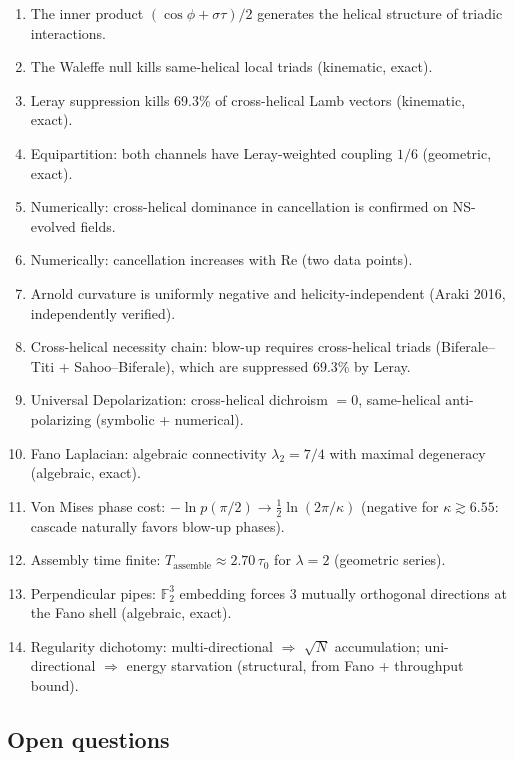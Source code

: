 \documentclass[11pt]{article}
\theoremstyle{definition}
\theoremstyle{remark}
\begin{document}
\begin{enumerate}
  \item The inner product $(\cos\phi + \sigma\tau)/2$ generates the
    helical structure of triadic interactions.
  \item The Waleffe null kills same-helical local triads
    (kinematic, exact).
  \item Leray suppression kills 69.3\% of cross-helical Lamb vectors
    (kinematic, exact).
  \item Equipartition: both channels have Leray-weighted coupling
    $1/6$ (geometric, exact).
  \item Numerically: cross-helical dominance in cancellation is
    confirmed on NS-evolved fields.
  \item Numerically: cancellation increases with Re (two data points).
  \item Arnold curvature is uniformly negative and
    helicity-independent (Araki 2016, independently verified).
  \item Cross-helical necessity chain: blow-up requires cross-helical
    triads (Biferale--Titi + Sahoo--Biferale), which are suppressed
    69.3\% by Leray.
  \item Universal Depolarization: cross-helical dichroism $= 0$,
    same-helical anti-polarizing (symbolic + numerical).
  \item Fano Laplacian: algebraic connectivity $\lambda_2 = 7/4$
    with maximal degeneracy (algebraic, exact).
  \item Von Mises phase cost: $-\ln p(\pi/2) \to
    \tfrac{1}{2}\ln(2\pi/\kappa)$ (negative for $\kappa \gtrsim 6.55$:
    cascade naturally favors blow-up phases).
  \item Assembly time finite: $T_{\mathrm{assemble}} \approx
    2.70\,\tau_0$ for $\lambda = 2$ (geometric series).
  \item Perpendicular pipes: $\mathbb{F}_2^3$ embedding forces
    3 mutually orthogonal directions at the Fano shell (algebraic, exact).
  \item Regularity dichotomy: multi-directional $\Rightarrow$ $\sqrt{N}$
    accumulation; uni-directional $\Rightarrow$ energy starvation
    (structural, from Fano + throughput bound).
\end{enumerate}

\subsection{Open questions}
\end{document}

